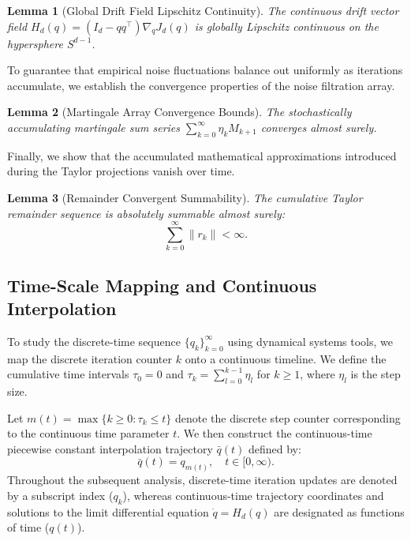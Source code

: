\documentclass[10pt,a4paper]{amsart}
\newtheorem{lemma}{Lemma}
\begin{document}
\begin{lemma}[Global Drift Field Lipschitz Continuity] \label{lem:lem7}
The continuous drift vector field $H_{d}(q) = (I_d - q q^\top)\nabla_q J_d(q)$ is globally Lipschitz continuous on the hypersphere $S^{d-1}$.
\end{lemma}

\noindent To guarantee that empirical noise fluctuations balance out uniformly as iterations accumulate, we establish the convergence properties of the noise filtration array.

\begin{lemma}[Martingale Array Convergence Bounds] \label{lem:lem8}
The stochastically accumulating martingale sum series $\sum_{k=0}^{\infty} \eta_k  M_{k+1}$ converges almost surely.
\end{lemma}

\noindent Finally, we show that the accumulated mathematical approximations introduced during the Taylor projections vanish over time.

\begin{lemma}[Remainder Convergent Summability] \label{lem:lem9}
The cumulative Taylor remainder sequence is absolutely summable almost surely: 
\begin{equation}
    \sum_{k=0}^{\infty} \|r_k\| < \infty.
\end{equation}
\end{lemma}
\subsection{Time-Scale Mapping and Continuous Interpolation}
To study the discrete-time sequence $\{q_k\}_{k=0}^{\infty}$ using dynamical systems tools, we map the discrete iteration counter $k$ onto a continuous timeline. We define the cumulative time intervals $\tau_0 = 0$ and $\tau_k = \sum_{l=0}^{k-1} \eta_l$ for $k \ge 1$, where $\eta_l$ is the step size. 

Let $m(t) = \max\{k \ge 0 : \tau_k \le t\}$ denote the discrete step counter corresponding to the continuous time parameter $t$. We then construct the continuous-time piecewise constant interpolation trajectory $\bar{q}(t)$ defined by:
\begin{equation}
    \bar{q}(t) = q_{m(t)}, \quad t \in [0, \infty).
\end{equation}
Throughout the subsequent analysis, discrete-time iteration updates are denoted by a subscript index ($q_k$), whereas continuous-time trajectory coordinates and solutions to the limit differential equation $\dot{q} = H_d(q)$ are designated as functions of time ($q(t)$).
\end{document}
